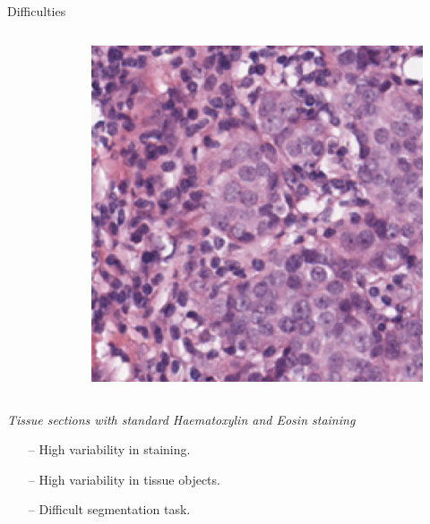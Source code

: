 \documentclass{beamer}
\begin{document}
\begin{frame}{Difficulties}
\begin{columns}[T]
\begin{column}{.3\textwidth}
\begin{figure}[!ht]
\label{}
\end{figure}
\end{column}%
\hfill%
\begin{column}{.3\textwidth}
\begin{figure}[!ht]
\centering
\includegraphics[width=\textwidth]{histo3.png}
\label{}
\end{figure}
\end{column}%
\end{columns}
{\centering \textit{Tissue sections with standard Haematoxylin and Eosin staining}} 
\begin{itemize}
\item [--] High variability in staining.
\item [--] High variability in tissue objects.
\item [--] Difficult segmentation task. 
\end{itemize}


\end{frame}
\end{document}
